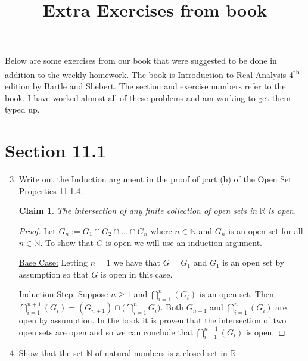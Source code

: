 \documentclass[12pt]{article}
\title{Extra Exercises from book}
\newtheorem*{claim}{Claim}
\begin{document}
\maketitle

Below are some exercises from our book that were suggested to be done in addition to the weekly homework. The book is Introduction to Real Analysis 4\textsuperscript{th} edition by Bartle and Shebert. The section and exercise numbers refer to the book. I have worked almost all of these problems and am working to get them typed up.

\section*{Section 11.1}

\begin{enumerate}[label=\arabic*., itemsep=1.5cm]

\setcounter{enumi}{2}

\item Write out the Induction argument in the proof of part (b) of the Open Set Properties 11.1.4.

\vspace{0.5cm}

\begin{claim}
The intersection of any finite collection of open sets in $\mathbb{R}$ is open.
\end{claim}

\begin{proof}
Let $G_n := G_1 \cap G_2 \cap \ldots \cap G_n$ where $n \in \mathbb{N}$ and $G_n$ is an open set for all $n \in \mathbb{N}$. To show that $G$ is open we will use an induction argument.

\underline{Base Case:} Letting $n = 1$ we have that $G = G_1$ and $G_1$ is an open set by assumption so that $G$ is open in this case.

\underline{Induction Step:} Suppose $n \geq 1$ and $\displaystyle \bigcap_{i = 1}^{n} (G_i)$ is an open set. Then $\displaystyle \bigcap_{i = 1}^{n + 1} (G_i) = (G_{n + 1}) \cap \bigg( \bigcap_{i = 1}^{n} G_i \bigg)$. Both $G_{n + 1}$ and $\displaystyle \bigcap_{i = 1}^{n} (G_i)$ are open by assumption. In the book it is proven that the intersection of two open sets are open and so we can conclude that $\displaystyle \bigcap_{i = 1}^{n + 1} (G_i)$ is open.
\end{proof}

\setcounter{enumi}{4}

\item Show that the set $\mathbb{N}$ of natural numbers is a closed set in $\mathbb{R}$.


\end{enumerate}
\end{document}
